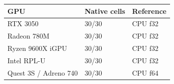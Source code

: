 \begin{tabular}{lll}
\toprule
GPU & Native cells & Reference \\
\midrule
RTX 3050 & 30/30 & CPU f32 \\
Radeon 780M & 30/30 & CPU f32 \\
Ryzen 9600X iGPU & 30/30 & CPU f32 \\
Intel RPL-U & 30/30 & CPU f32 \\
Quest 3S / Adreno 740 & 30/30 & CPU f64 \\
\bottomrule
\end{tabular}
